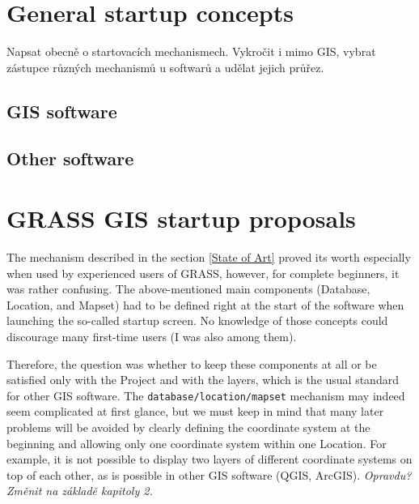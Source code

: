 \documentclass[a4paper,10pt,twoside]{article}
\begin{document}
\section{General startup concepts}
\noindent
\large

\noindent Napsat obecně o startovacích mechanismech. Vykročit i mimo GIS, vybrat zástupce různých mechanismů u softwarů a udělat jejich průřez.

\subsection{GIS software}
\subsection{Other software}


\newpage
\vspace*{-1cm}
\section{GRASS GIS startup proposals}
\noindent
\large

\noindent The mechanism described in the section \ref{State of Art} proved its worth especially when used by experienced users of GRASS, however, for complete beginners, it was rather confusing. The above-mentioned main components (Database, Location, and Mapset) had to be defined right at the start of the software when launching the so-called startup screen. No knowledge of those concepts could discourage many first-time users (I was also among them).

Therefore, the question was whether to keep these components at all or be satisfied only with the Project and with the layers, which is the usual standard for other GIS software. The \texttt{database/location/mapset} mechanism may indeed seem complicated at first glance, but we must keep in mind that many later problems will be avoided by clearly defining the coordinate system at the beginning and allowing only one coordinate system within one Location. For example, it is not possible to display two layers of different coordinate systems on top of each other, as is possible in other GIS software (QGIS, ArcGIS). \textit{\color{red} Opravdu? Změnit na základě kapitoly 2.}
\end{document}
